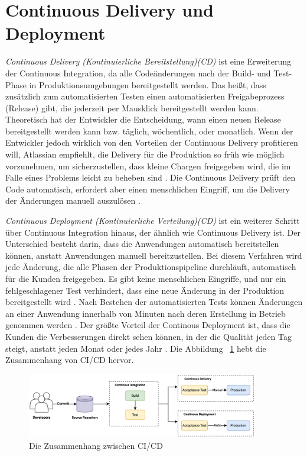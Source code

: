 \section{Continuous Delivery und Deployment}

\textit{Continuous Delivery (Kontinuierliche Bereitstellung)(CD)} ist eine Erweiterung der Continuous Integration, da alle Codeänderungen nach der Build- und Test-Phase in Produktionsumgebungen bereitgestellt werden. Das heißt, dass zusätzlich zum automatisierten Testen einen automatisierten Freigabeprozess (Release) gibt, die jederzeit per Mausklick bereitgestellt werden kann. Theoretisch hat der Entwickler die Entscheidung, wann einen neuen Release bereitgestellt werden kann bzw. täglich, wöchentlich, oder monatlich. Wenn der Entwickler jedoch wirklich von den Vorteilen der Continuous Delivery profitieren will, Atlassian empfiehlt, die Delivery für die Produktion so früh wie möglich vorzunehmen, um sicherzustellen, dass kleine Chargen freigegeben wird, die im Falle eines Problems leicht zu beheben sind \cite{Atlassian}. Die Continuous Delivery prüft den Code automatisch, erfordert aber einen menschlichen Eingriff, um die Delivery der Änderungen manuell auszulösen \cite{GitLab:CD}.

\textit{Continuous Deployment (Kontinuierliche Verteilung)(CD)} ist ein weiterer Schritt über Continuous Integration hinaus, der ähnlich wie Continuous Delivery ist. Der Unterschied besteht darin, dass die Anwendungen automatisch bereitstellen können, anstatt Anwendungen manuell bereitzustellen. Bei diesem Verfahren wird jede Änderung, die alle Phasen der Produktionspipeline durchläuft, automatisch für die Kunden freigegeben. Es gibt keine menschlichen Eingriffe, und nur ein fehlgeschlagener Test verhindert, dass eine neue Änderung in der Produktion bereitgestellt wird \cite{Atlassian}. Nach Bestehen der automatisierten Tests können Änderungen an einer Anwendung innerhalb von Minuten nach deren Erstellung in Betrieb genommen werden \cite{GitLab:CD}. Der größte Vorteil der Continous Deployment ist, dass die Kunden die Verbesserungen direkt sehen können, in der die Qualität jeden Tag steigt, anstatt jeden Monat oder jedes Jahr \cite{Atlassian}. Die Abbildung ~\ref{fig:zusammenhandCICD} hebt die Zusammenhang von CI/CD hervor.

\begin{figure}[!htbp]%
	\centering
	\includegraphics[width=0.9\textwidth]{Graphics/The-relationship-between-CI_CD.png}
	\caption{Die Zusammenhang zwischen CI/CD \cite{Shahin2017}}
	\label{fig:zusammenhandCICD}
\end{figure}


